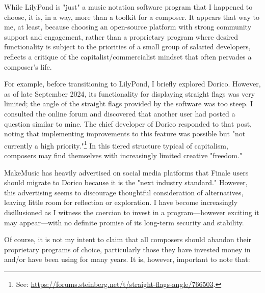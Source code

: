 While LilyPond is "just" a music notation software program that I happened to choose, it is, in a way, more than a toolkit for a composer. It appears that way to me, at least, because choosing an open-source platform with strong community support and engagement, rather than a proprietary program where desired functionality is subject to the priorities of a small group of salaried developers, reflects a critique of the capitalist/commercialist mindset that often pervades a composer’s life.
  
For example, before transitioning to LilyPond, I briefly explored Dorico. However, as of late September 2024, its functionality for displaying straight flags was very limited; the angle of the straight flags provided by the software was too steep. I consulted the online forum and discovered that another user had posted a question similar to mine. The chief developer of Dorico responded to that post, noting that implementing improvements to this feature was possible but "not currently a high priority."\footnote{See: \url{https://forums.steinberg.net/t/straight-flags-angle/766503}.} In this tiered structure typical of capitalism, composers may find themselves with increasingly limited creative "freedom." 

MakeMusic has heavily advertised on social media platforms that Finale users should migrate to Dorico because it is the "next industry standard." However, this advertising seems to discourage thoughtful consideration of alternatives, leaving little room for reflection or exploration. I have become increasingly disillusioned as I witness the coercion to invest in a program—however exciting it may appear—with no definite promise of its long-term security and stability.

Of course, it is not my intent to claim that all composers should abandon their proprietary programs of choice, particularly those they have invested money in and/or have been using for many years. It is, however, important to note that: 

